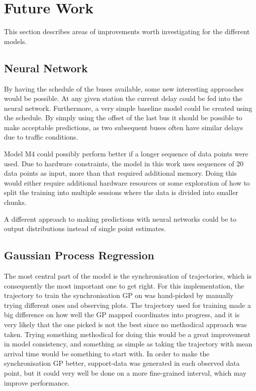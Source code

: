 \section{Future Work}
\label{sec:future-work}
This section describes areas of improvements worth investigating for the different models.

\subsection{Neural Network}
By having the schedule of the buses available, some new interesting approaches would be possible. At any given station the current delay could be fed into the neural network. Furthermore, a very simple baseline model could be created using the schedule. By simply using the offset of the last bus it should be possible to make acceptable predictions, as two subsequent buses often have similar delays due to traffic conditions.

Model M4 could possibly perform better if a longer sequence of data points were used. Due to hardware constraints, the model in this work uses sequences of 20 data points as input, more than that required additional memory. Doing this would either require additional hardware resources or some exploration of how to split the training into multiple sessions where the data is divided into smaller chunks.

A different approach to making predictions with neural networks could be to output distributions instead of single point estimates.

\subsection{Gaussian Process Regression}
The most central part of the model is the synchronisation of
trajectories, which is consequently the most important one to get
right. For this implementation, the trajectory to train the
synchronisation GP on was hand-picked by manually trying different
ones and observing plots. The trajectory used for training made a big
difference on how well the GP mapped coordinates into progress, and it
is very likely that the one picked is not the best since no methodical
approach was taken. Trying something methodical for doing this would
be a great improvement in model consistency, and something as simple as taking the
trajectory with mean arrival time would be something to start with. In
order to make the synchronisation GP better, support-data was generated
in each observed data point, but it could very well be done on a more
fine-grained interval, which may improve performance.


